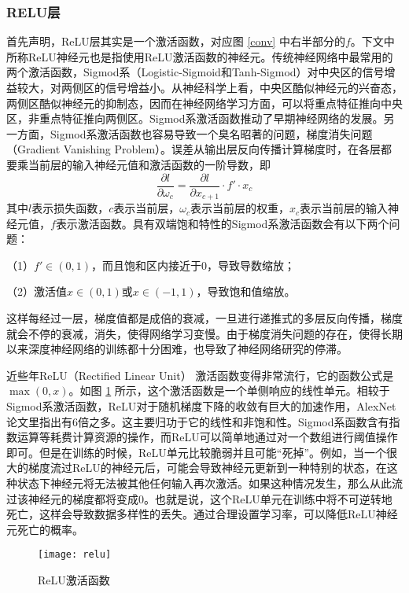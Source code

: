 \subsubsection{RELU层}
首先声明，ReLU层其实是一个激活函数，对应图 \ref{conv} 中右半部分的$f$。下文中所称ReLU神经元也是指使用ReLU激活函数的神经元。传统神经网络中最常用的两个激活函数，Sigmod系（Logistic-Sigmoid和Tanh-Sigmod）对中央区的信号增益较大，对两侧区的信号增益小。从神经科学上看，中央区酷似神经元的兴奋态，两侧区酷似神经元的抑制态，因而在神经网络学习方面，可以将重点特征推向中央区，非重点特征推向两侧区。Sigmod系激活函数推动了早期神经网络的发展。另一方面，Sigmod系激活函数也容易导致一个臭名昭著的问题，梯度消失问题（Gradient Vanishing Problem）。误差从输出层反向传播计算梯度时，在各层都要乘当前层的输入神经元值和激活函数的一阶导数，即
\begin{equation}
\frac{\partial l}{\partial \omega_c}=\frac{\partial l}{\partial x_{c+1}}\cdot f'\cdot x_c
\end{equation}
其中$l$表示损失函数，$c$表示当前层，$\omega_c$表示当前层的权重，$x_c$表示当前层的输入神经元值，$f$表示激活函数。具有双端饱和特性的Sigmod系激活函数会有以下两个问题：
\begin{namelist}{}
	\item （1）$f'\in (0, 1)$，而且饱和区内接近于0，导致导数缩放；	
	\item （2）激活值$x\in (0,1)$或$x\in (-1,1)$，导致饱和值缩放。
\end{namelist}
这样每经过一层，梯度值都是成倍的衰减，一旦进行递推式的多层反向传播，梯度就会不停的衰减，消失，使得网络学习变慢。由于梯度消失问题的存在，使得长期以来深度神经网络的训练都十分困难，也导致了神经网络研究的停滞。

近些年ReLU（Rectified Linear Unit）\cite{relu} 激活函数变得非常流行，它的函数公式是$\max(0,x)$。如图 \ref{fig:relu} 所示，这个激活函数是一个单侧响应的线性单元。相较于Sigmod系激活函数，ReLU对于随机梯度下降的收敛有巨大的加速作用，AlexNet \cite{alexnet} 论文里指出有6倍之多。这主要归功于它的线性和非饱和性。Sigmod系函数含有指数运算等耗费计算资源的操作，而ReLU可以简单地通过对一个数组进行阈值操作即可。但是在训练的时候，ReLU单元比较脆弱并且可能``死掉''。例如，当一个很大的梯度流过ReLU的神经元后，可能会导致神经元更新到一种特别的状态，在这种状态下神经元将无法被其他任何输入再次激活。如果这种情况发生，那么从此流过该神经元的梯度都将变成0。也就是说，这个ReLU单元在训练中将不可逆转地死亡，这样会导致数据多样性的丢失。通过合理设置学习率，可以降低ReLU神经元死亡的概率。

\begin{figure}[h]
	\centering
	\texttt{[image: relu]}
	\caption{ReLU激活函数}
	\label{fig:relu}
\end{figure}

